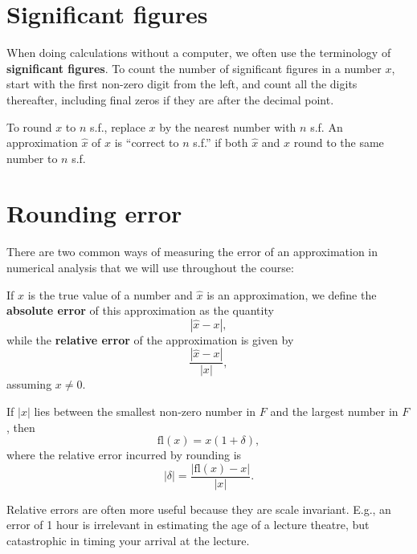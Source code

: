 \documentclass[
  letterpaper,
  DIV=11,
  numbers=noendperiod]{scrreprt}
\newenvironment{fbxSimple}[3]{\begin{tcolorbox}[enhanced, breakable,%
attach boxed title to top*={xshift=1.4pt},
boxed title style={boxrule=0.0mm, fuzzy shadow={1pt}{-1pt}{0mm}{0.1mm}{gray}, arc=.3em, rounded corners=east, sharp corners=west}, colframe=#1-color2, colbacktitle=#1-color1, colback = white, coltitle=black,  titlerule=0mm, toprule=0pt, bottomrule=.7pt, leftrule=.3em, rightrule=.7pt, outer arc=.3em,  	left=.5em, right=.5em, bottomtitle=1mm, toptitle=1mm,title=\textbf{#2}\hspace{0.5em}{#3}]}
{\end{tcolorbox}}
\begin{document}
\section{Significant figures}\label{significant-figures}

When doing calculations without a computer, we often use the terminology
of \textbf{significant figures}. To count the number of significant
figures in a number \(x\), start with the first non-zero digit from the
left, and count all the digits thereafter, including final zeros if they
are after the decimal point.

To round \(x\) to \(n\) s.f., replace \(x\) by the nearest number with
\(n\) s.f. An approximation \(\hat{x}\) of \(x\) is ``correct to \(n\)
s.f.'' if both \(\hat{x}\) and \(x\) round to the same number to \(n\)
s.f.

\section{Rounding error}\label{rounding-error}

There are two common ways of measuring the error of an approximation in
numerical analysis that we will use throughout the course:

\label{absolute-and-relative-errors}
\begin{fbxSimple}{definition}{Definition 1.1: }{Absolute and relative errors}
\label{absolute-and-relative-errors}
If \(x\) is the true value of a number and \(\hat{x}\) is an
approximation, we define the \textbf{absolute error} of this
approximation as the quantity \[
|\hat{x} - x|,
\] while the \textbf{relative error} of the approximation is given by \[
\frac{|\hat{x} - x|}{|x|},
\] assuming \(x \neq 0\).

\end{fbxSimple}

If \(|x|\) lies between the smallest non-zero number in \(F\) and the
largest number in \(F\), then \[
\mathrm{fl}(x) = x(1+\delta),
\] where the relative error incurred by rounding is \[
|\delta| = \frac{|\mathrm{fl}(x) - x|}{|x|}.
\]

\begin{tcolorbox}[enhanced jigsaw, bottomrule=.15mm, colbacktitle=quarto-callout-note-color!10!white, breakable, arc=.35mm, coltitle=black, colback=white, bottomtitle=1mm, opacityback=0, title=\textcolor{quarto-callout-note-color}{\faInfo}\hspace{0.5em}{Note}, titlerule=0mm, toptitle=1mm, opacitybacktitle=0.6, colframe=quarto-callout-note-color-frame, leftrule=.75mm, rightrule=.15mm, left=2mm, toprule=.15mm]

Relative errors are often more useful because they are scale invariant.
E.g., an error of 1 hour is irrelevant in estimating the age of a
lecture theatre, but catastrophic in timing your arrival at the lecture.

\end{tcolorbox}
\end{document}
